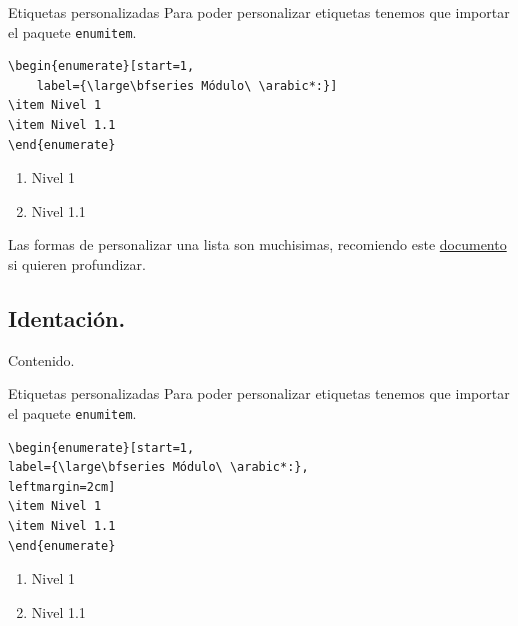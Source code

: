 \documentclass[dvipsnames,xcolor, handout]{beamer}
\theoremstyle{plain}
\theoremstyle{definition}
\begin{document}
\begin{frame}[fragile]{Etiquetas personalizadas}
Para poder personalizar etiquetas tenemos que importar el paquete \verb!enumitem!.
\begin{verbatim}
\begin{enumerate}[start=1,
    label={\large\bfseries Módulo\ \arabic*:}]
\item Nivel 1
\item Nivel 1.1
\end{enumerate}
\end{verbatim}
\begin{enumerate}
\item[\large\bfseries Módulo 1:] Nivel 1
\item[\large\bfseries Módulo 2:] Nivel 1.1
\end{enumerate}

Las formas de personalizar una lista son muchisimas, recomiendo este \href{http://mirrors.ucr.ac.cr/CTAN/macros/latex/contrib/enumitem/enumitem.pdf}{\textcolor{colorClase}{documento}} si quieren profundizar.

\end{frame}
    
\subsection{Identación.}
\begin{frame}{Contenido.}
  \tableofcontents[currentsubsection]
\end{frame}
\begin{frame}[fragile]{Etiquetas personalizadas}
Para poder personalizar etiquetas tenemos que importar el paquete \verb!enumitem!.
\begin{verbatim}
\begin{enumerate}[start=1,
label={\large\bfseries Módulo\ \arabic*:},
leftmargin=2cm]
\item Nivel 1
\item Nivel 1.1
\end{enumerate}
\end{verbatim}
\begin{enumerate}[leftmargin=2cm]
\item[\large\bfseries Módulo 1:] Nivel 1
\item[\large\bfseries Módulo 2:] Nivel 1.1
\end{enumerate}
\end{frame}
\end{document}
